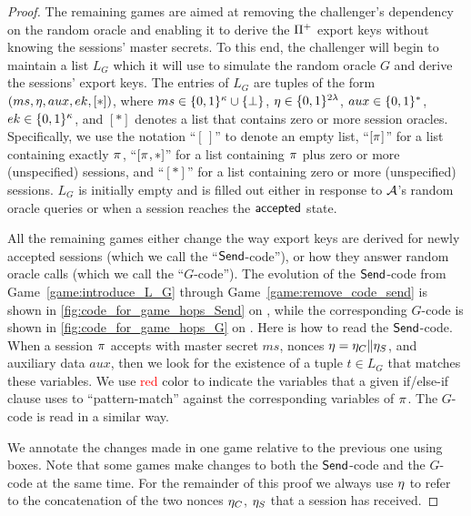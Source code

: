 \begin{proof}
The remaining games are aimed at removing the challenger's dependency on the random oracle
and enabling it to derive the $\mathrm{\Pi}^{+}$ export keys without knowing the sessions' master secrets.
To this end,
the challenger will begin to maintain a list $L_G$
which it will use to simulate the  random oracle $G$
and derive the sessions' export keys.
The entries of $L_G$ are tuples of the form $(ms, \eta, aux, ek, [*])$,
where $ms \in \lbrace 0, 1 \rbrace^\kappa \cup \lbrace \bot \rbrace$,
$\eta \in \lbrace 0, 1 \rbrace^{2\lambda}$,
$aux \in \lbrace 0, 1 \rbrace^*$,
$ek \in \lbrace 0, 1 \rbrace^\kappa$,
and $[*]$ denotes a list that contains zero or more session oracles.
Specifically, 
we use the notation ``$[\,]$'' to denote an empty list,
``$[\oracle]$'' for a list containing exactly $\oracle$,
``$[\oracle,*]$'' for a list containing $\oracle$ plus zero or more (unspecified) sessions,
and ``$[*]$'' for a list containing zero or more (unspecified) sessions.
$L_G$ is initially empty and is filled out either in response to $\mathcal{A}$'s random oracle queries or when a session reaches the $\mathsf{accepted}$ state.

All the remaining games either change the way export keys are derived for newly accepted sessions
%
(which we call the ``$\mathsf{Send}$-code''), 
or how they answer random oracle calls
(which we call the ``$G$-code'').
The evolution of the $\mathsf{Send}$-code from Game~\ref{game:introduce_L_G} through Game~\ref{game:remove_code_send} is shown in \cref{fig:code_for_game_hops_Send} on ,
while the corresponding $G$-code is shown in \cref{fig:code_for_game_hops_G} on .
Here is how to read the $\mathsf{Send}$-code.
When a session $\oracle$ accepts with master secret $ms$,
nonces $\eta = \eta_{C} \| \eta_{S}$, and auxiliary data $aux$,
then we look for the existence of  a tuple $t \in L_G$ that matches these variables.
We use \textcolor{red}{red} color to indicate the variables that a given if/else-if clause uses to ``pattern-match'' against the corresponding variables of $\oracle$.
The $G$-code is read in a similar way.

We annotate the changes made in one game relative to the previous one using boxes.
Note that some games make changes to both the $\mathsf{Send}$-code and
the $G$-code at the same time.
For the remainder of this proof we always use $\eta$ to refer to the concatenation of the two nonces $\eta_{C}$, $\eta_{S}$ that a session has received.






\end{proof}
